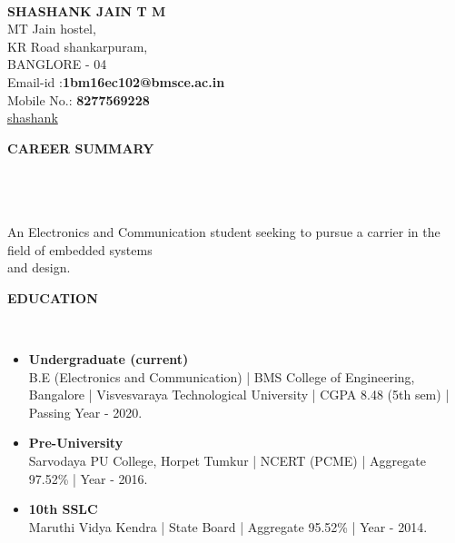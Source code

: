 \documentclass[a4paper,10pt]{article}
\newcommand{\lsep}{-0.5cm}
\newcommand{\resheading}[1]{{\small \colorbox{mygrey}{\begin{minipage}{0.975\textwidth}{\textbf{#1 \vphantom{p\^{E}}}}\end{minipage}}}}
\begin{document}
\hspace{0.5cm}\\[-0.2cm]



\textbf{SHASHANK JAIN T M} \\ 
\indent MT Jain hostel, \\
\indent KR Road shankarpuram,\\
\indent BANGLORE - 04\\
\indent Email-id :\textbf{1bm16ec102@bmsce.ac.in} \\
\indent Mobile No.: \textbf{8277569228} \\
\indent\faGithub\href{https://github.com/shashankjainTM}{shashank}\hfill 
{}\\

\resheading{\textbf{CAREER SUMMARY} }\\[\lsep]\\ \\
\indent An Electronics and Communication student seeking to pursue a carrier in the field of embedded systems\\ \indent and design.\\

\resheading{\textbf{EDUCATION} }\\[\lsep]
\begin{itemize}
\item \noindent \textbf{Undergraduate (current)}\\
\indent B.E (Electronics and Communication) | BMS College of Engineering, Bangalore | Visvesvaraya Technological University | CGPA 8.48 (5th sem) | Passing Year - 2020.

\item \noindent \textbf{Pre-University}\\
\indent Sarvodaya PU College, Horpet Tumkur | NCERT (PCME) | Aggregate 97.52\% | Year - 2016.

\item \noindent \textbf{10th SSLC}\\
\indent Maruthi Vidya Kendra | State Board | Aggregate 95.52\% | Year - 2014.
\end{itemize}
\end{document}
